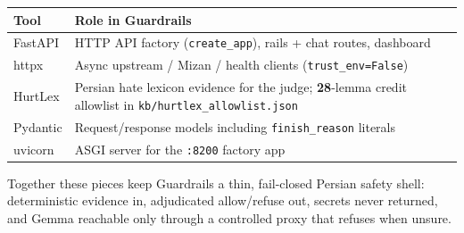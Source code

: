 \begin{longtable}[]{@{}
  >{\raggedright\arraybackslash}p{}
  >{\raggedright\arraybackslash}p{}@{}}
\toprule\noalign{}
Tool & Role in Guardrails \\
\midrule\noalign{}
\endhead
\bottomrule\noalign{}
\endlastfoot
FastAPI & HTTP API factory (\texttt{create\_app}), rails + chat routes, dashboard \\
httpx & Async upstream / Mizan / health clients (\texttt{trust\_env=False}) \\
HurtLex & Persian hate lexicon evidence for the judge; \textbf{28}-lemma credit allowlist in \texttt{kb/hurtlex\_allowlist.json} \\
Pydantic & Request/response models including \texttt{finish\_reason} literals \\
uvicorn & ASGI server for the \texttt{:8200} factory app \\
\end{longtable}

Together these pieces keep Guardrails a thin, fail-closed Persian safety shell: deterministic evidence in, adjudicated allow/refuse out, secrets never returned, and Gemma reachable only through a controlled proxy that refuses when unsure.

